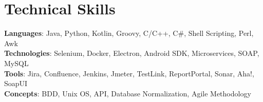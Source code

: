 \section{Technical Skills}
    \begin{itemize}[leftmargin=0.15in, label={}]
	\small{\item{
		\textbf{Languages}{: Java, Python, Kotlin, Groovy, C/C++, C#, Shell Scripting, Perl, Awk} \\
		\textbf{Technologies}{: Selenium, Docker, Electron, Android SDK, Microservices, SOAP, MySQL} \\
		\textbf{Tools}{: Jira, Confluence, Jenkins, Jmeter, TestLink, ReportPortal, Sonar, Aha!, SoapUI} \\
		\textbf{Concepts}{: BDD, Unix OS, API, Database Normalization, Agile Methodology} \\
	}}
    \end{itemize}